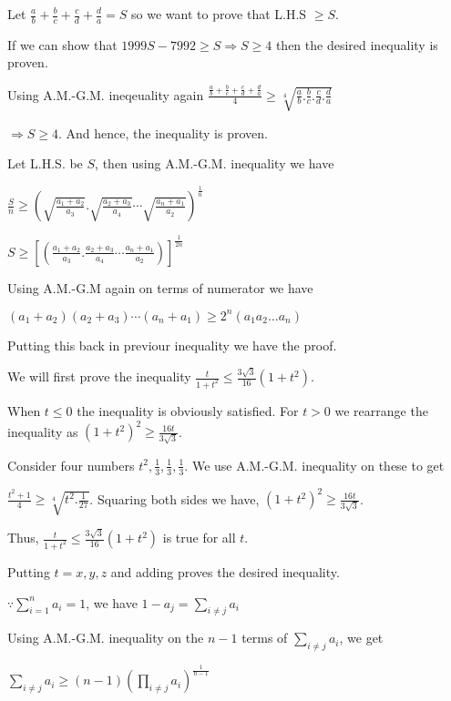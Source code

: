   Let $\frac{a}{b} + \frac{b}{c} + \frac{c}{d} + \frac{d}{a} = S$ so we want to prove that L.H.S $\geq S$.

  If we can show that $1999S - 7992\geq S\Rightarrow S\geq 4$ then the desired inequality is proven.

  Using A.M.-G.M. ineqeuality again $\frac{\frac{a}{b} + \frac{b}{c} + \frac{c}{d} + \frac{d}{a}}{4}\geq
  \sqrt[4]{\frac{a}{b} . \frac{b}{c} . \frac{c}{d} . \frac{d}{a}}$

  $\Rightarrow S\geq 4$. And hence, the inequality is proven.
\item Let L.H.S. be $S$, then using A.M.-G.M. inequality we have

  $\frac{S}{n}\geq \left(\sqrt{\frac{a_1 + a_2}{a_3}}.\sqrt{\frac{a_2 + a_3}{a_4}}\cdots\sqrt{\frac{a_n +
    a_1}{a_2}}\right)^{\frac{1}{n}}$

  $S\geq \left[\left(\frac{a_1 + a_2}{a_3}.\frac{a_2 + a_3}{a_4}\cdots \frac{a_n +
    a_1}{a_2}\right)\right]^{\frac{1}{2n}}$

  Using A.M.-G.M again on terms of numerator we have

  $(a_1 + a_2)(a_2 + a_3)\cdots(a_n + a_1)\geq 2^n(a_1a_2\ldots a_n)$

  Putting this back in previour inequality we have the proof.
\item We will first prove the inequality $\frac{t}{1 + t^2}\leq \frac{3\sqrt{3}}{16}(1 + t^2)$.

  When $t\leq 0$ the inequality is obviously satisfied. For $t > 0$ we rearrange the inequality as $(1 +
  t^2)^2\geq \frac{16t}{3\sqrt{3}}$.

  Consider four numbers $t^2, \frac{1}{3}, \frac{1}{3}, \frac{1}{3}$. We use A.M.-G.M. inequality on these
  to get

  $\frac{t^2 + 1}{4}\geq \sqrt[4]{t^2.\frac{1}{27}}$. Squaring both sides we have, $(1 + t^2)^2\geq
  \frac{16t}{3\sqrt{3}}$.

  Thus, $\frac{t}{1 + t^2}\leq \frac{3\sqrt{3}}{16}(1 + t^2)$ is true for all $t$.

  Putting $t = x, y, z$ and adding proves the desired inequality.
\item $\displaystyle\because \sum_{i = 1}^na_i = 1$, we have $1 - a_j = \displaystyle\sum_{i\neq j}a_i$

  Using A.M.-G.M. inequality on the $n - 1$ terms of $\displaystyle\sum_{i\neq j}a_i$, we get

  $\displaystyle\sum_{i\neq j}a_i\geq (n - 1)\left(\prod_{i\neq j}a_i\right)^{\frac{1}{n - 1}}$

